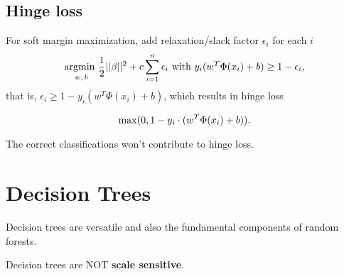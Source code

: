 \documentclass[12pt,oneside,a4paper]{article}
\numberwithin{equation}{section}
\newcommand{\argmin}[1]{\stackunder{\textrm{argmin }}{\scriptsize$#1$}}
\newcommand{\rmmax}[1]{\stackunder{\textrm{max}}{\scriptsize$#1$}}
\begin{document}
\subsection{Hinge loss}
For soft margin maximization, add relaxation/slack factor $\epsilon_i$ for each $i$
\begin{equation}
\argmin{w,b}\frac{1}{2}||\beta||^2 + c \sum_{i=1}^{n}\epsilon_i\textrm{ with } y_i(w^T\Phi(x_i) + b) \ge 1 - \epsilon_i,
\end{equation}
that is, $\epsilon_i \ge 1- y_i(w^T\Phi(x_i) + b) $, which results in hinge loss

\begin{equation}
\rmmax{}(0, 1- y_i \cdot (w^T\Phi(x_i) + b)).
\end{equation}

The correct classifications won't contribute to hinge loss.

\section{Decision Trees}
Decision trees are versatile and also the fundamental components of random forests. 

Decision trees are NOT \textbf{scale sensitive}.
\end{document}
